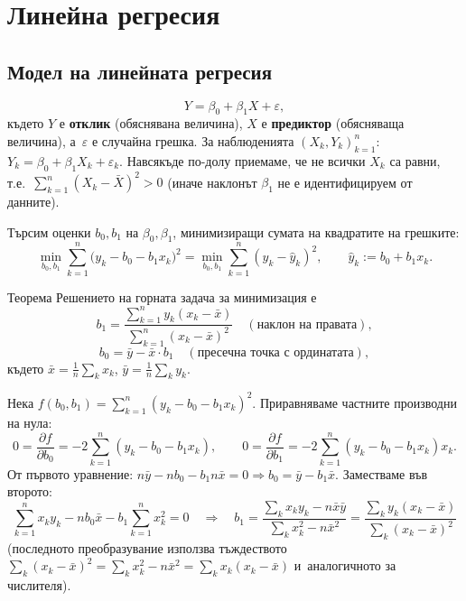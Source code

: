 \chapter{Линейна регресия}

\section{Модел на линейната регресия}

\begin{defbox}
\[
  Y = \beta_0 + \beta_1 X + \varepsilon,
\]
където $Y$ е \textbf{отклик} (обяснявана величина), $X$ е
\textbf{предиктор} (обясняваща величина), а~$\varepsilon$ е случайна
грешка. За наблюденията $(X_k,Y_k)_{k=1}^n$: $Y_k=\beta_0+\beta_1
X_k+\varepsilon_k$. Навсякъде по-долу приемаме, че не всички $X_k$ са
равни, т.е.\ $\sum_{k=1}^n(X_k-\bar X)^2>0$ (иначе наклонът $\beta_1$
не е идентифицируем от данните).
\end{defbox}

\begin{rembox}
Търсим оценки $b_0,b_1$ на $\beta_0,\beta_1$, минимизиращи сумата на
квадратите на грешките:
\[
  \min_{b_0,b_1} \sum_{k=1}^n \big(y_k-b_0-b_1x_k\big)^2 = \min_{b_0,b_1}\sum_{k=1}^n(y_k-\hat y_k)^2, \qquad \hat y_k := b_0+b_1x_k.
\]
\end{rembox}

\begin{thmbox}[]{Теорема}
Решението на горната задача за минимизация е
\[
  b_1 = \frac{\sum_{k=1}^n y_k(x_k-\bar x)}{\sum_{k=1}^n (x_k-\bar x)^2} \quad(\text{наклон на правата}),
\]
\[
  b_0 = \bar y - \bar x\cdot b_1 \quad(\text{пресечна точка с~ординатата}),
\]
където $\bar x=\tfrac1n\sum_k x_k$, $\bar y=\tfrac1n\sum_k y_k$.
\end{thmbox}

\begin{proofbox}
Нека $f(b_0,b_1)=\sum_{k=1}^n(y_k-b_0-b_1x_k)^2$. Приравняваме
частните производни на нула:
\[
  0 = \frac{\partial f}{\partial b_0} = -2\sum_{k=1}^n(y_k-b_0-b_1x_k),
  \qquad
  0 = \frac{\partial f}{\partial b_1} = -2\sum_{k=1}^n(y_k-b_0-b_1x_k)x_k.
\]
От първото уравнение: $n\bar y - nb_0 - b_1 n\bar x = 0 \Rightarrow
b_0=\bar y-b_1\bar x$. Заместваме във второто:
\[
  \sum_{k=1}^n x_ky_k - nb_0\bar x - b_1\sum_{k=1}^n x_k^2 = 0
  \quad\Longrightarrow\quad
  b_1 = \frac{\sum_k x_ky_k-n\bar x\bar y}{\sum_k x_k^2-n\bar x^2} = \frac{\sum_k y_k(x_k-\bar x)}{\sum_k (x_k-\bar x)^2}
\]
(последното преобразувание използва тъждеството $\sum_k(x_k-\bar
x)^2=\sum_k x_k^2-n\bar x^2=\sum_k x_k(x_k-\bar x)$ и~аналогичното
за числителя). \qedbg
\end{proofbox}

